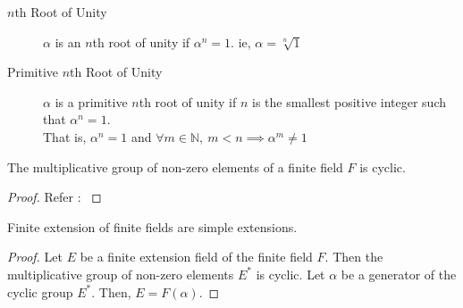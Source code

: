 
\begin{description}
	\item[$n$th Root of Unity] $\alpha$ is an $n$th root of unity if $\alpha^n = 1$.
		ie, $\alpha = \sqrt[n]{1}$
	\item[Primitive $n$th Root of Unity] $\alpha$ is a primitive $n$th root of unity if $n$ is the smallest positive integer such that $\alpha^n = 1$.\\
		That is, $\alpha^n = 1$ and $\forall m \in \mathbb{N},\ m < n \implies \alpha^m \ne 1$
\end{description}

\begin{theorem}
	The multiplicative group of non-zero elements of a finite field $F$ is cyclic.
\end{theorem}
\begin{proof}
	Refer : \cite[Theorem 23.6]{fraleigh}
\end{proof}
\begin{corollary}
	Finite extension of finite fields are simple extensions.
\end{corollary}
\begin{proof}
	Let $E$ be a finite extension field of the finite field $F$.
	Then the multiplicative group of non-zero elements $E^\ast$ is cyclic.
	Let $\alpha$ be a generator of the cyclic group $E^\ast$.
	Then, $E = F(\alpha)$.
\end{proof}

